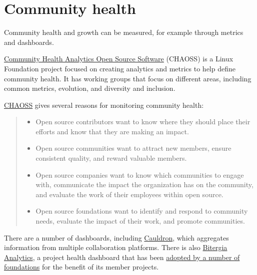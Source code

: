 


\chapter{Community health}

Community health and growth can be measured, for example through metrics and dashboards.

\href{https://chaoss.community/}{Community Health Analytics Open Source Software} (CHAOSS) is a Linux Foundation project focused on creating analytics and metrics to help define community health.  It has working groups that focus on different areas, including common metrics, evolution, and diversity and inclusion.

\begin{kaobox}[frametitle=CHAOSS: the importance of community health]

\href{https://chaoss.community/about/}{CHAOSS} gives several reasons for monitoring community health:

\begin{quote}

\begin{itemize}

\item Open source contributors want to know where they should place their efforts and know that they are making an impact.
\item Open source communities want to attract new members, ensure consistent quality, and reward valuable members.
\item Open source companies want to know which communities to engage with, communicate the impact the organization has on the community, and evaluate the work of their employees within open source.
\item Open source foundations want to identify and respond to community needs, evaluate the impact of their work, and promote communities.

\end{itemize}

\end{quote}

\end{kaobox}

There are a number of dashboards, including \href{https://cauldron.io/}{Cauldron}, which aggregates information from multiple collaboration platforms.  There is also \href{https://bitergia.com/bitergia-analytics/}{Bitergia Analytics}, a project health dashboard that has been \href{https://bitergia.com/oss-foundations/}{adopted by a number of foundations} for the benefit of its member projects.


